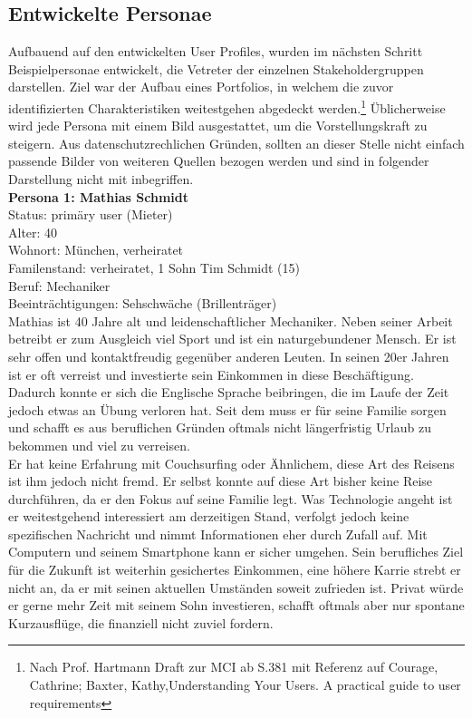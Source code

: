 \newpage
\subsection{Entwickelte Personae}
Aufbauend auf den entwickelten User Profiles, wurden im nächsten Schritt Beispielpersonae entwickelt, die Vetreter der einzelnen Stakeholdergruppen darstellen. Ziel war der Aufbau eines Portfolios, in welchem die zuvor identifizierten Charakteristiken weitestgehen abgedeckt werden.\footnote{Nach Prof. Hartmann Draft zur MCI ab S.381 mit Referenz auf Courage, Cathrine; Baxter, Kathy,Understanding Your Users. A practical guide to user requirements} 
Üblicherweise wird jede Persona mit einem Bild ausgestattet, um die Vorstellungskraft zu steigern. Aus datenschutzrechlichen Gründen, sollten an dieser Stelle nicht einfach passende Bilder von weiteren Quellen bezogen werden und sind in folgender Darstellung nicht mit inbegriffen.\\

\textbf{Persona 1: Mathias Schmidt}\\
Status: primäry user (Mieter)\\

Alter: 40 \\
Wohnort: München, verheiratet\\
Familenstand: verheiratet, 1 Sohn Tim Schmidt (15)\\
Beruf: Mechaniker\\
Beeinträchtigungen: Sehschwäche (Brillenträger) \\

Mathias ist 40 Jahre alt und leidenschaftlicher Mechaniker. Neben seiner Arbeit betreibt er zum Ausgleich viel Sport und ist ein naturgebundener Mensch.
Er ist sehr offen und kontaktfreudig gegenüber anderen Leuten. In seinen 20er Jahren ist er oft verreist und investierte sein Einkommen in diese Beschäftigung. Dadurch konnte er sich die Englische Sprache beibringen, die im Laufe der Zeit jedoch etwas an Übung verloren hat. Seit dem muss er für seine Familie sorgen und schafft es aus beruflichen Gründen oftmals nicht längerfristig Urlaub zu bekommen und viel zu verreisen.\\

Er hat keine Erfahrung mit Couchsurfing oder Ähnlichem, diese Art des Reisens ist ihm jedoch nicht fremd. Er selbst konnte auf diese Art bisher keine Reise durchführen, da er den Fokus auf seine Familie legt.
Was Technologie angeht ist er weitestgehend interessiert am derzeitigen Stand, verfolgt jedoch keine spezifischen Nachricht und nimmt Informationen eher durch Zufall auf. Mit Computern und seinem Smartphone kann er sicher umgehen. Sein berufliches Ziel für die Zukunft ist weiterhin gesichertes Einkommen, eine höhere Karrie strebt er nicht an, da er mit seinen aktuellen Umständen soweit zufrieden ist. Privat würde er gerne mehr Zeit mit seinem Sohn investieren, schafft oftmals aber nur spontane Kurzausflüge, die finanziell nicht zuviel fordern.\\

